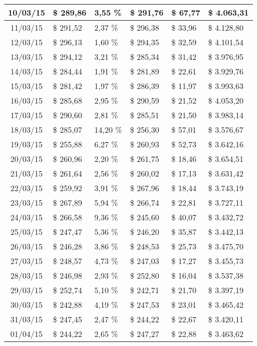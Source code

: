 \begin{small}
\begin{longtable}{|c|l|l|l|l|l|}
10/03/15 & \$ 289,86 & 3,55 \% & \$ 291,76 & \$ 67,77 & \$ 4.063,31 \\ \hline
11/03/15 & \$ 291,52 & 2,37 \% & \$ 296,38 & \$ 33,96 & \$ 4.128,80 \\ \hline
12/03/15 & \$ 296,13 & 1,60 \% & \$ 294,35 & \$ 32,59 & \$ 4.101,54 \\ \hline
13/03/15 & \$ 294,12 & 3,21 \% & \$ 285,34 & \$ 31,42 & \$ 3.976,95 \\ \hline
14/03/15 & \$ 284,44 & 1,91 \% & \$ 281,89 & \$ 22,61 & \$ 3.929,76 \\ \hline
15/03/15 & \$ 281,42 & 1,97 \% & \$ 286,39 & \$ 11,97 & \$ 3.993,63 \\ \hline
16/03/15 & \$ 285,68 & 2,95 \% & \$ 290,59 & \$ 21,52 & \$ 4.053,20 \\ \hline
17/03/15 & \$ 290,60 & 2,81 \% & \$ 285,51 & \$ 21,50 & \$ 3.983,14 \\ \hline
18/03/15 & \$ 285,07 & 14,20 \% & \$ 256,30 & \$ 57,01 & \$ 3.576,67 \\ \hline
19/03/15 & \$ 255,88 & 6,27 \% & \$ 260,93 & \$ 52,73 & \$ 3.642,16 \\ \hline
20/03/15 & \$ 260,96 & 2,20 \% & \$ 261,75 & \$ 18,46 & \$ 3.654,51 \\ \hline
21/03/15 & \$ 261,64 & 2,56 \% & \$ 260,02 & \$ 17,13 & \$ 3.631,42 \\ \hline
22/03/15 & \$ 259,92 & 3,91 \% & \$ 267,96 & \$ 18,44 & \$ 3.743,19 \\ \hline
23/03/15 & \$ 267,89 & 5,94 \% & \$ 266,74 & \$ 22,81 & \$ 3.727,11 \\ \hline
24/03/15 & \$ 266,58 & 9,36 \% & \$ 245,60 & \$ 40,07 & \$ 3.432,72 \\ \hline
25/03/15 & \$ 247,47 & 5,36 \% & \$ 246,20 & \$ 35,87 & \$ 3.442,13 \\ \hline
26/03/15 & \$ 246,28 & 3,86 \% & \$ 248,53 & \$ 25,73 & \$ 3.475,70 \\ \hline
27/03/15 & \$ 248,57 & 4,73 \% & \$ 247,03 & \$ 17,27 & \$ 3.455,73 \\ \hline
28/03/15 & \$ 246,98 & 2,93 \% & \$ 252,80 & \$ 16,04 & \$ 3.537,38 \\ \hline
29/03/15 & \$ 252,74 & 5,10 \% & \$ 242,71 & \$ 21,70 & \$ 3.397,19 \\ \hline
30/03/15 & \$ 242,88 & 4,19 \% & \$ 247,53 & \$ 23,01 & \$ 3.465,42 \\ \hline
31/03/15 & \$ 247,45 & 2,47 \% & \$ 244,22 & \$ 22,67 & \$ 3.420,11 \\ \hline
01/04/15 & \$ 244,22 & 2,65 \% & \$ 247,27 & \$ 22,88 & \$ 3.463,62 \\ \hline

\end{longtable}
\end{small}
